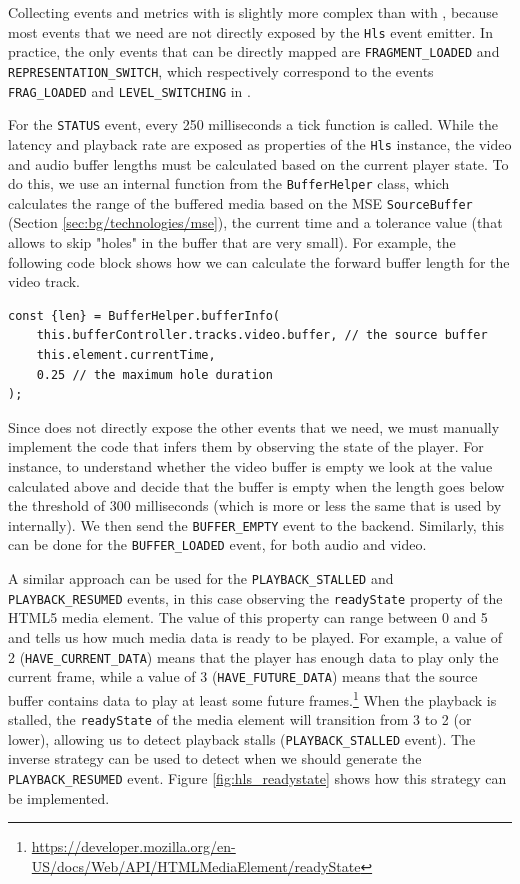 Collecting events and metrics with \hlsjs{} is slightly more complex than with \dashjs{}, because most events that we need are not directly exposed by the \texttt{Hls} event emitter. In practice, the only events that can be directly mapped are \texttt{FRAGMENT\_LOADED} and \texttt{REPRESENTATION\_SWITCH}, which respectively correspond to the events \texttt{FRAG\_LOADED} and \texttt{LEVEL\_SWITCHING} in \hlsjs{}.

For the \texttt{STATUS} event, every 250 milliseconds a tick function is called. While the latency and playback rate are exposed as properties of the \texttt{Hls} instance, the video and audio buffer lengths must be calculated based on the current player state. To do this, we use an internal \hlsjs{} function from the \texttt{BufferHelper} class, which calculates the range of the buffered media based on the MSE \texttt{SourceBuffer} (Section \ref{sec:bg/technologies/mse}), the current time and a tolerance value (that allows to skip "holes" in the buffer that are very small). For example, the following code block shows how we can calculate the forward buffer length for the video track.

\begin{verbatim}
const {len} = BufferHelper.bufferInfo(
    this.bufferController.tracks.video.buffer, // the source buffer
    this.element.currentTime,
    0.25 // the maximum hole duration
);
\end{verbatim}

Since \hlsjs{} does not directly expose the other events that we need, we must manually implement the code that infers them by observing the state of the player. For instance, to understand whether the video buffer is empty we look at the value calculated above and decide that the buffer is empty when the length goes below the threshold of 300 milliseconds (which is more or less the same that is used by \dashjs{} internally). We then send the \texttt{BUFFER\_EMPTY} event to the backend. Similarly, this can be done for the \texttt{BUFFER\_LOADED} event, for both audio and video.

A similar approach can be used for the \texttt{PLAYBACK\_STALLED} and \texttt{PLAYBACK\_RESUMED} events, in this case observing the \texttt{readyState} property of the HTML5 media element. The value of this property can range between 0 and 5 and tells us how much media data is ready to be played. For example, a value of 2 (\texttt{HAVE\_CURRENT\_DATA}) means that the player has enough data to play only the current frame, while a value of 3 (\texttt{HAVE\_FUTURE\_DATA}) means that the source buffer contains data to play at least some future frames.\footnote{\url{https://developer.mozilla.org/en-US/docs/Web/API/HTMLMediaElement/readyState}} When the playback is stalled, the \texttt{readyState} of the media element will transition from 3 to 2 (or lower), allowing us to detect playback stalls (\texttt{PLAYBACK\_STALLED} event). The inverse strategy can be used to detect when we should generate the \texttt{PLAYBACK\_RESUMED} event. Figure \ref{fig:hls_readystate} shows how this strategy can be implemented.

